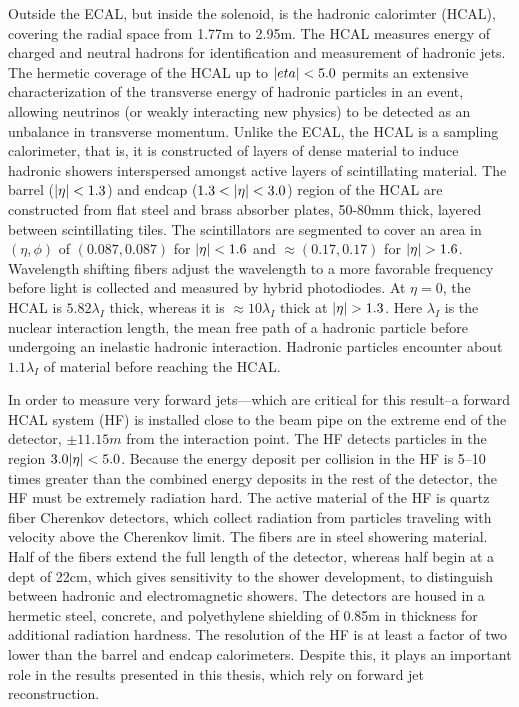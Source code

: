 Outside the ECAL, but inside the solenoid, is the hadronic calorimter (HCAL),
covering the radial space from 1.77\unit{m} to 2.95\unit{m}.
The HCAL measures energy of charged and neutral hadrons for identification
and measurement of hadronic jets. The hermetic coverage of the HCAL
up to $\lvert eta \rvert < 5.0$ permits an extensive characterization of the 
transverse energy of hadronic particles in an event, allowing neutrinos (or weakly
interacting new physics) to be detected as an unbalance in transverse momentum.
Unlike the ECAL, the HCAL is a sampling calorimeter, that is, it is constructed
of layers of dense material to induce hadronic showers interspersed amongst 
active layers of scintillating material. 
The barrel ($\lvert \eta \rvert < 1.3$) and endcap ($1.3 < \lvert \eta \rvert < 3.0$) region of the HCAL are constructed from 
flat steel and brass absorber plates, 50-80\unit{mm} thick, layered between scintillating tiles.
The scintillators are segmented to cover an area in $(\eta, \phi)$ of $(0.087,0.087)$
for $\lvert \eta \rvert < 1.6$ and $\approx(0.17,0.17)$ for $\lvert \eta \rvert > 1.6$.
Wavelength shifting fibers adjust the wavelength to a more favorable
frequency before light is collected and measured by hybrid photodiodes.
At $\eta = 0$, the HCAL is $5.82\lambda_I$ thick, whereas it is $\approx10\lambda_I$ thick 
at $\lvert \eta \rvert > 1.3$.
Here $\lambda_{I}$ is the nuclear interaction length, the mean free path of a hadronic particle
before undergoing an inelastic hadronic interaction.
Hadronic particles encounter about $1.1\lambda_{I}$ of material before reaching
the HCAL.

In order to measure very forward jets---which are critical for this result--a 
forward HCAL system (HF) is installed close to the beam pipe on the extreme end of the 
detector, $\pm11.15\unit{m}$ from the interaction point. 
The HF detects particles in the region $3.0 \lvert \eta \rvert < 5.0$. Because the energy deposit
per collision in the HF is 5--10 times greater than the combined energy deposits in
the rest of the detector, the HF must be extremely radiation hard.
The active material of the HF is quartz fiber Cherenkov detectors, which 
collect radiation from particles traveling with velocity above the Cherenkov limit.
The fibers are in steel showering material. Half of the fibers extend the full length
of the detector, whereas half begin at a dept of 22\unit{cm}, which gives
sensitivity to the shower development, to distinguish between hadronic and electromagnetic
showers. The detectors are housed in a hermetic steel, concrete, 
and polyethylene shielding of 0.85\unit{m} in thickness for additional radiation
hardness. The resolution of the HF is at least a factor of two lower than the 
barrel and endcap calorimeters. Despite this, it plays an important role 
in the results presented in this thesis, which rely on forward jet reconstruction.

